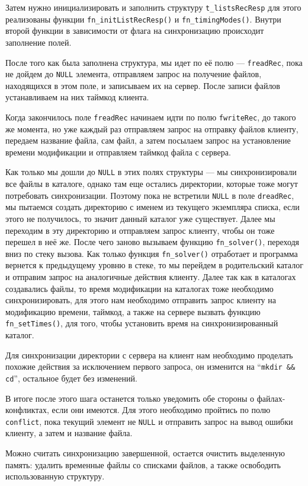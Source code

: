 Затем нужно инициализировать и заполнить структуру \verb|t_listsRecResp| для этого реализованы функции \verb|fn_initListRecResp()| и \verb|fn_timingModes()|.
Внутри второй функции в зависимости от флага на синхронизацию происходит заполнение полей.

После того как была заполнена структура, мы идет по её полю --- \verb|freadRec|, пока не дойдем до \verb|NULL| элемента, отправляем запрос на получение файлов, находящихся в этом поле, и записываем их на сервер. После записи файлов устанавливаем на них таймкод клиента.

Когда закончилось поле \verb|freadRec| начинаем идти по полю \verb|fwriteRec|, до такого же момента, но уже каждый раз отправляем запрос на отправку файлов клиенту, передаем название файла, сам файл, а затем посылаем запрос на установление времени модификации и отправляем таймкод файла с сервера.

Как только мы дошли до \verb|NULL| в этих полях структуры --- мы синхронизировали все файлы в каталоге, однако там еще остались директории, которые тоже могут потребовать синхронизации. Поэтому пока не встретили \verb|NULL| в поле \verb|dreadRec|, мы пытаемся создать директорию с именем из текущего экземпляра списка, если этого не получилось, то значит данный каталог уже существует. Далее мы переходим в эту директорию и отправляем запрос клиенту, чтобы он тоже перешел в неё же. После чего заново вызываем функцию \verb|fn_solver()|, переходя вниз по стеку вызова. Как только функция \verb|fn_solver()| отработает и программа вернется к предыдущему уровню в стеке, то мы перейдем в родительский каталог и отправим запрос на аналогичные действия клиенту. Далее так как в каталогах создавались файлы, то время модификации на каталогах тоже необходимо синхронизировать, для этого нам необходимо отправить запрос клиенту на модификацию времени, таймкод, а также на сервере вызвать функцию \verb|fn_setTimes()|, для того, чтобы установить время на синхронизированный каталог.

Для синхронизации директории с сервера на клиент нам необходимо проделать похожие действия за исключением первого запроса, он изменится на ``\verb|mkdir && cd|'', остальное будет без изменений.

В итоге после этого шага останется только уведомить обе стороны о файлах-конфликтах, если они имеются. Для этого необходимо пройтись по полю \verb|conflict|, пока текущий элемент не \verb|NULL| и отправить запрос на вывод ошибки клиенту, а затем и название файла.

Можно считать синхронизацию завершенной, остается очистить выделенную память: удалить временные файлы со списками файлов, а также освободить использованную структуру.
